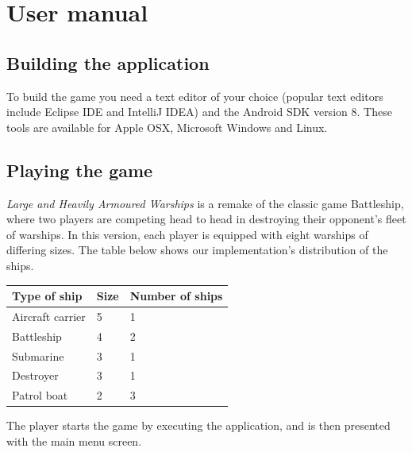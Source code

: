 \chapter{User manual}


\section{Building the application}

To build the game you need a text editor of your choice (popular text editors include Eclipse IDE and IntelliJ IDEA) and the Android SDK version 8. These tools are available for Apple OSX, Microsoft Windows and Linux.


\section{Playing the game}

\emph{Large and Heavily Armoured Warships} is a remake of the classic game Battleship, where two players are competing head to head in destroying their opponent's fleet of warships. In this version, each player is equipped with eight warships of differing sizes. The table below shows our implementation's distribution of the ships.

\begin{tabular}{|l|l|l|}
	\hline
	\bf{Type of ship} 	& \bf{Size} & \bf{Number of ships} \\
	\hline
	
	Aircraft carrier	& 5		& 1 \\
	Battleship 			& 4		& 2 \\
	Submarine			& 3		& 1 \\
	Destroyer			& 3		& 1 \\
	Patrol boat			& 2		& 3 \\
	\hline
\end{tabular}



The player starts the game by executing the application, and is then presented with the main menu screen.

